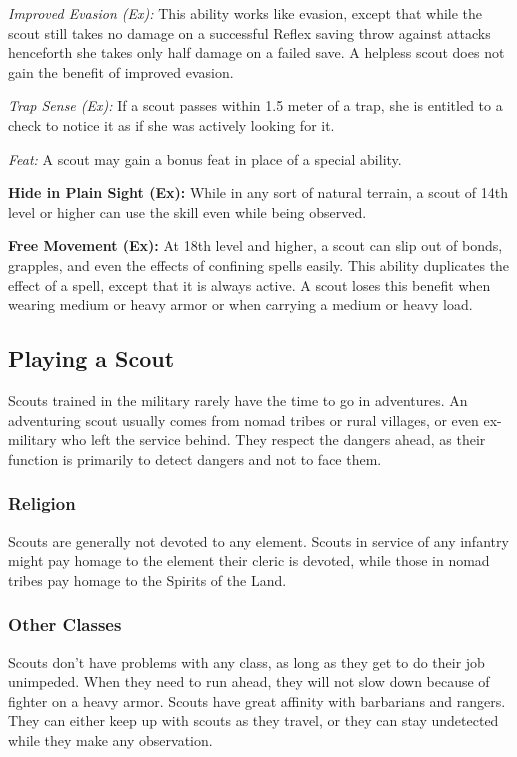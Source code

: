 \textit{Improved Evasion (Ex):} This ability works like evasion, except that while the scout still takes no damage on a successful Reflex saving throw against attacks henceforth she takes only half damage on a failed save. A helpless scout does not gain the benefit of improved evasion.

\textit{Trap Sense (Ex):} If a scout passes within 1.5 meter of a trap, she is entitled to a  check to notice it as if she was actively looking for it.

\textit{Feat:} A scout may gain a bonus feat in place of a special ability.


\textbf{Hide in Plain Sight (Ex):} While in any sort of natural terrain, a scout of 14th level or higher can use the  skill even while being observed.


\textbf{Free Movement (Ex):} At 18th level and higher, a scout can slip out of bonds, grapples, and even the effects of confining spells easily. This ability duplicates the effect of a  spell, except that it is always active. A scout loses this benefit when wearing medium or heavy armor or when carrying a medium or heavy load.



\subsection{Playing a Scout}
Scouts trained in the military rarely have the time to go in adventures. An adventuring scout usually comes from nomad tribes or rural villages, or even ex-military who left the service behind. They respect the dangers ahead, as their function is primarily to detect dangers and not to face them.

\subsubsection{Religion}
Scouts are generally not devoted to any element. Scouts in service of any infantry might pay homage to the element their cleric is devoted, while those in nomad tribes pay homage to the Spirits of the Land.

\subsubsection{Other Classes}
Scouts don't have problems with any class, as long as they get to do their job unimpeded. When they need to run ahead, they will not slow down because of fighter on a heavy armor. Scouts have great affinity with barbarians and rangers. They can either keep up with scouts as they travel, or they can stay undetected while they make any observation.

